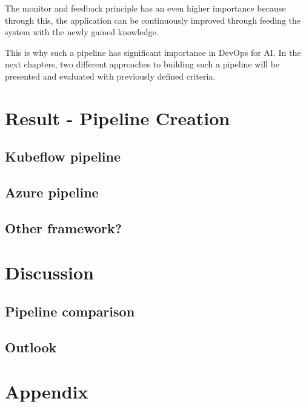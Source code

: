 \documentclass[12pt,english,a4paper,oneside,,tablecaptionabove]{scrbook}
\begin{document}
The monitor and feedback principle has an even higher importance because
through this, the application can be continuously improved through
feeding the system with the newly gained knowledge.

This is why such a pipeline has significant importance in DevOps for AI.
In the next chapters, two different approaches to building such a
pipeline will be presented and evaluated with previously defined
criteria.

\hypertarget{sec:result}{%
\chapter{Result - Pipeline Creation}\label{sec:result}}

\hypertarget{sec:kubeflowpip}{%
\section{Kubeflow pipeline}\label{sec:kubeflowpip}}

\hypertarget{sec:azurepip}{%
\section{Azure pipeline}\label{sec:azurepip}}

\hypertarget{sec:pip3}{%
\section{Other framework?}\label{sec:pip3}}

\hypertarget{sec:discussion}{%
\chapter{Discussion}\label{sec:discussion}}

\hypertarget{sec:pipelineeval}{%
\section{Pipeline comparison}\label{sec:pipelineeval}}

\hypertarget{sec:outlook}{%
\section{Outlook}\label{sec:outlook}}

\hypertarget{appendix}{%
\chapter{Appendix}\label{appendix}}
\end{document}
